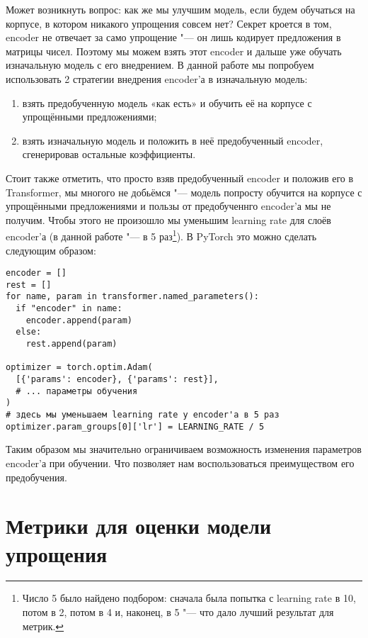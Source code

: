 Может возникнуть вопрос: как же мы улучшим модель, если будем обучаться на корпусе, в котором никакого упрощения совсем нет?
Секрет кроется в том, encoder не отвечает за само упрощение "--- он лишь кодирует предложения в матрицы чисел.
Поэтому мы можем взять этот encoder и дальше уже обучать изначальную модель с его внедрением.
В данной работе мы попробуем использовать 2 стратегии внедрения encoder'а в изначальную модель:
\begin{enumerate}[1.]%
  \item взять предобученную модель «как есть» и обучить её на корпусе с упрощёнными предложениями;
  \item взять изначальную модель и положить в неё предобученный encoder, сгенерировав остальные коэффициенты.
\end{enumerate}

Стоит также отметить, что просто взяв предобученный encoder и положив его в Transformer, мы многого не добьёмся "--- модель попросту обучится на корпусе с упрощёнными предложениями и пользы от предобученнго encoder'а мы не получим.
Чтобы этого не произошло мы уменьшим learning rate для слоёв encoder'а (в данной работе "--- в 5 раз\footnote{Число 5 было найдено подбором: сначала была попытка с learning rate в 10, потом в 2, потом в 4 и, наконец, в 5 "--- что дало лучший результат для метрик.}).
В PyTorch это можно сделать следующим образом:
\begin{verbatim}
encoder = []
rest = []
for name, param in transformer.named_parameters():
  if "encoder" in name:
    encoder.append(param)
  else:
    rest.append(param)

optimizer = torch.optim.Adam(
  [{'params': encoder}, {'params': rest}],
  # ... параметры обучения
)
# здесь мы уменьшаем learning rate у encoder'а в 5 раз
optimizer.param_groups[0]['lr'] = LEARNING_RATE / 5
\end{verbatim}

Таким образом мы значительно ограничиваем возможность изменения параметров encoder'а при обучении.
Что позволяет нам воспользоваться преимуществом его предобучения.


\section{Метрики для оценки модели упрощения}


